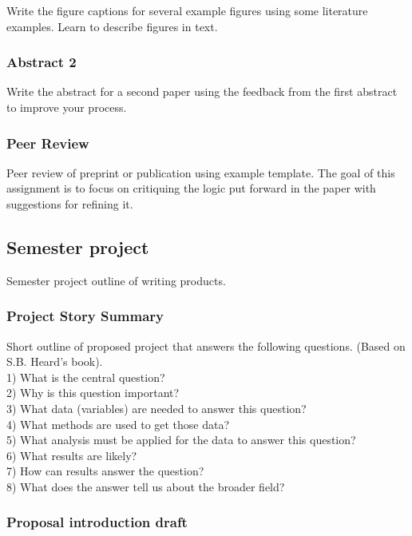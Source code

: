 \documentclass[11pt,]{article}
\begin{document}
Write the figure captions for several example figures using some
literature examples. Learn to describe figures in text.

\subsubsection{Abstract 2}\label{abstract-2}

Write the abstract for a second paper using the feedback from the first
abstract to improve your process.

\subsubsection{Peer Review}\label{peer-review}

Peer review of preprint or publication using example template. The goal
of this assignment is to focus on critiquing the logic put forward in
the paper with suggestions for refining it.

\subsection{Semester project}\label{semester-project}

Semester project outline of writing products.

\subsubsection{Project Story Summary}\label{project-story-summary}

Short outline of proposed project that answers the following questions.
(Based on S.B. Heard's book).\\
1) What is the central question?\\
2) Why is this question important?\\
3) What data (variables) are needed to answer this question?\\
4) What methods are used to get those data?\\
5) What analysis must be applied for the data to answer this question?\\
6) What results are likely?\\
7) How can results answer the question?\\
8) What does the answer tell us about the broader field?

\subsubsection{Proposal introduction
draft}\label{proposal-introduction-draft}
\end{document}
